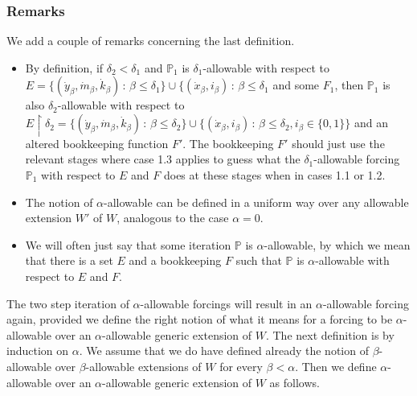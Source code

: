 \documentclass[a4paper,11pt]{article}
\newcommand{\forceP}{\mathbb{P}}
\begin{document}
\subsubsection{Remarks}
We add a couple of remarks concerning the last definition.
\begin{itemize}

\item By definition, if $\delta_2 < \delta_1$ and $\forceP_1$ is $\delta_1$-allowable with respect to $E= \{(\dot{y}_{\beta}, \dot{m}_{\beta} ,\dot{k}_{\beta}) \, : \,  \beta \le \delta_1\}\cup \{(\dot{x}_{\beta}, i_{\beta} ) \, : \, \beta \le \delta_1$ and some $F_1$, then  $\forceP_1$ is also $\delta_2$-allowable with respect to $E \upharpoonright \delta_2 = \{( \dot{y}_{\beta}, \dot{m}_{\beta} ,\dot{k}_{\beta}) \, : \,  \beta \le \delta_2\} \cup \{ ( \dot{x}_{\beta}, i_{\beta} ) \, : \, \beta \le \delta_2, i_{\beta} \in \{0,1\} \}$ and an altered bookkeeping function $F'$. The bookkeeping $F'$ should just use the relevant stages where case 1.3 applies to guess what the $\delta_1$-allowable forcing $\forceP_1$ with respect to $E$ and $F$ does at these stages when in cases 1.1 or 1.2.
 
\item The notion of $\alpha$-allowable can be defined in a uniform way over any allowable extension $W'$ of $W$, analogous to the case $\alpha=0$. 

\item We will often just say that some iteration $\forceP$ is $\alpha$-allowable, by which we mean that there is a set $E$ and a bookkeeping $F$ such that $\forceP $ is $\alpha$-allowable with respect to $E$ and $F$.
\end{itemize}

The two step iteration of $\alpha$-allowable forcings will result in an $\alpha$-allowable forcing again, provided we define the right notion of what it means for a forcing to be $\alpha$-allowable over an $\alpha$-allowable generic extension of $W$. The next definition is by induction on $\alpha$. We assume that we do have defined already  the notion of $\beta$-allowable over $\beta$-allowable extensions of $W$ for every $\beta < \alpha$. Then we define $\alpha$-allowable over an $\alpha$-allowable generic extension of $W$ as follows.
\end{document}
